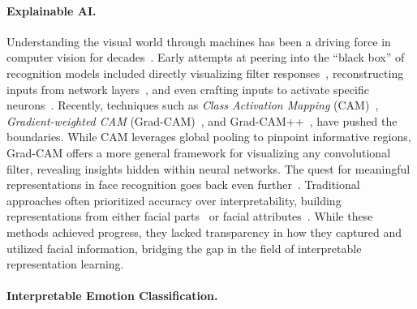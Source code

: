\paragraph{Explainable AI.}

Understanding the visual world through machines has been a driving force in computer vision for decades~\cite{SudderthTFW05,parikh2011human,SinghGE12,JunejaVJZ13,MahendranV16}. 
Early attempts at peering into the ``black box'' of recognition models included directly visualizing filter responses~\cite{ZeilerF14}, 
reconstructing inputs from network layers~\cite{ZeilerTF11}, 
and even crafting inputs to activate specific neurons~\cite{NguyenYC15}.
Recently, techniques such as \textit{Class Activation Mapping} (CAM)~\cite{ZhouKLOT16}, 
\textit{Gradient-weighted CAM} (Grad-CAM)~\cite{SelvarajuCDVPB17}, 
and Grad-CAM++~\cite{chattopadhay2018grad}, 
have pushed the boundaries. 
While CAM leverages global pooling to pinpoint informative regions, 
Grad-CAM offers a more general framework for visualizing any convolutional filter, 
revealing insights hidden within neural networks.
The quest for meaningful representations in face recognition goes back even further~\cite{ChenHLZ02,learned2016labeled,o2018face}. 
Traditional approaches often prioritized accuracy over interpretability, 
building representations from either facial parts~\cite{CaoYTS10,LiHLBY13} or facial attributes~\cite{KumarBBN09}. 
While these methods achieved progress, 
they lacked transparency in how they captured and utilized facial information, 
bridging the gap in the field of interpretable representation learning. 


\paragraph{Interpretable Emotion Classification.}

